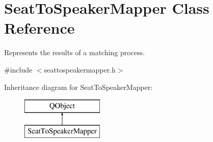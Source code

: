 \hypertarget{classSeatToSpeakerMapper}{\section{Seat\-To\-Speaker\-Mapper Class Reference}
\label{classSeatToSpeakerMapper}
}


Represents the results of a matching process.  




{\ttfamily \#include $<$seattospeakermapper.\-h$>$}

Inheritance diagram for Seat\-To\-Speaker\-Mapper\-:\begin{figure}[H]
\begin{center}
\leavevmode
\includegraphics[height=2.000000cm]{classSeatToSpeakerMapper}
\end{center}
\end{figure}
